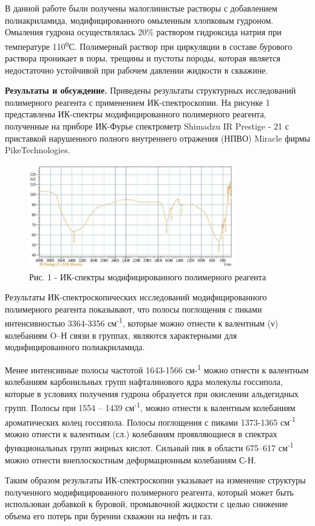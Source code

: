 \begin{multicols}{2}
В данной работе были получены малоглинистые растворы с добавлением
полиакриламида, модифицированного омыленным хлопковым гудроном. Омыления
гудрона осуществлялась 20\% раствором гидроксида натрия при температуре
110\textsuperscript{о}С. Полимерный раствор при циркуляции в составе
бурового раствора проникает в поры, трещины и пустоты породы, которая
является недостаточно устойчивой при рабочем давлении жидкости в
скважине.

{\bfseries Результаты и обсуждение.} Приведены результаты структурных
исследований полимерного реагента с применением ИК-спектроскопии. На
рисунке 1 представлены ИК-спектры модифицированного полимерного
реагента, полученные на приборе ИК-Фурье спектрометр Shimadzu IR
Prestige - 21 с приставкой нарушенного полного внутреннего отражения
(НПВО) Miracle фирмы PikeTechnologies.
\end{multicols}

\begin{figure}[H]
	\centering
	\includegraphics[width=0.8\textwidth]{assets/1262}
	\caption*{Рис. 1 - ИК-спектры модифицированного полимерного реагента}
\end{figure}

\begin{multicols}{2}
Результаты ИК-спектроскопических исследований модифицированного
полимерного реагента показывают, что полосы поглощения с пиками
интенсивностью 3364-3356 см\textsuperscript{-1}, которые можно отнести к
валентным (ν) колебаниям O--Н связи в группах, являются характерными для
модифицированного полиакриламида.

Менее интенсивные полосы частотой 1643-1566 см-\textsuperscript{1} можно
отнести к валентным колебаниям карбонильных групп нафталинового ядра
молекулы госсипола, которые в условиях получения гудрона образуется при
окислении альдегидных групп. Полосы при 1554 -- 1439
см\textsuperscript{-1}, можно отнести к валентным колебаниям
ароматических колец госсипола. Полосы поглощения с пиками 1373-1365
см\textsuperscript{-1} можно отнести к валентным (сл.) колебаниям
проявляющиеся в спектрах функциональных групп жирных кислот. Сильный пик
в области 675--617 см\textsuperscript{-1} можно отнести внеплоскостным
деформационным колебаниям С-Н.

Таким образом результаты ИК-спектроскопии указывает на изменение
структуры полученного модифицированного полимерного реагента, который
может быть использован добавкой к буровой, промывочной жидкости с целью
снижение объема его потерь при бурении скважин на нефть и газ.
\end{multicols}

